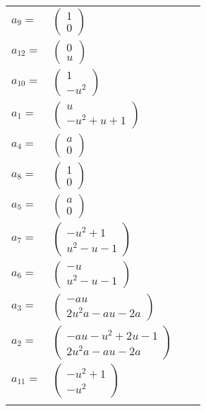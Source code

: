 \documentclass[1p]{elsarticle_modified}
\theoremstyle{definition}
\begin{document}
\begin{tabular}{m{7pt} m{180pt} m{7pt} m{180pt} }
\flushright $a_{9}=$&$\begin{pmatrix}1\\0\end{pmatrix}$ \\
\flushright $a_{12}=$&$\begin{pmatrix}0\\u\end{pmatrix}$ \\
\flushright $a_{10}=$&$\begin{pmatrix}1\\- u^2\end{pmatrix}$ \\
\flushright $a_{1}=$&$\begin{pmatrix}u\\- u^2+u+1\end{pmatrix}$ \\
\flushright $a_{4}=$&$\begin{pmatrix}a\\0\end{pmatrix}$ \\
\flushright $a_{8}=$&$\begin{pmatrix}1\\0\end{pmatrix}$ \\
\flushright $a_{5}=$&$\begin{pmatrix}a\\0\end{pmatrix}$ \\
\flushright $a_{7}=$&$\begin{pmatrix}- u^2+1\\u^2- u-1\end{pmatrix}$ \\
\flushright $a_{6}=$&$\begin{pmatrix}- u\\u^2- u-1\end{pmatrix}$ \\
\flushright $a_{3}=$&$\begin{pmatrix}- a u\\2 u^2 a- a u-2 a\end{pmatrix}$ \\
\flushright $a_{2}=$&$\begin{pmatrix}- a u- u^2+2 u-1\\2 u^2 a- a u-2 a\end{pmatrix}$ \\
\flushright $a_{11}=$&$\begin{pmatrix}- u^2+1\\- u^2\end{pmatrix}$\\&\end{tabular}
\end{document}
